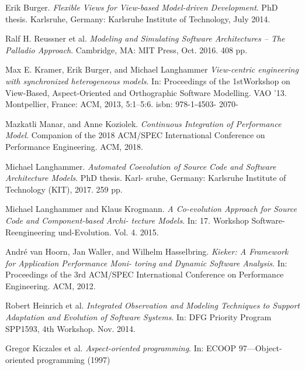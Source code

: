 \documentclass[twoside, english]{sdqthesis}
\begin{document}
\begin{thebibliography}{9}


Erik Burger. 
\textit{Flexible Views for View-based Model-driven Development}. 
PhD thesis. Karlsruhe, Germany: Karlsruhe Institute of Technology, July 2014.

Ralf H. Reussner et al. 
\textit{Modeling and Simulating Software Architectures – The Palladio Approach}. 
Cambridge, MA: MIT Press, Oct. 2016. 408 pp.

Max E. Kramer, Erik Burger, and Michael Langhammer 
\textit{View-centric engineering
with synchronized heterogeneous models}. 
In: Proceedings of the
1stWorkshop on View-Based, Aspect-Oriented and Orthographic Software Modelling.
VAO ’13. Montpellier, France: ACM, 2013, 5:1–5:6. isbn: 978-1-4503-
2070-

Mazkatli Manar, and Anne Koziolek. 
\textit{Continuous Integration of Performance Model}. 
Companion of the 2018 ACM/SPEC International Conference on Performance Engineering. ACM, 2018.

Michael Langhammer.  
\textit{Automated Coevolution of Source Code and Software Architecture Models}. 
PhD thesis. Karl- sruhe, Germany: Karlsruhe Institute of Technology (KIT), 2017. 259 pp.

Michael Langhammer and Klaus Krogmann.  
\textit{A Co-evolution Approach for Source Code and Component-based Archi- tecture Models}. 
 In: 17. Workshop Software-Reengineering und-Evolution. Vol. 4. 2015.

André van Hoorn, Jan Waller, and Wilhelm Hasselbring.  
\textit{Kieker: A Framework for Application Performance Moni- toring and Dynamic Software Analysis}. 
In: Proceedings of the 3rd ACM/SPEC International Conference on Performance Engineering. ACM, 2012.


Robert Heinrich et al.  
\textit{Integrated Observation and Modeling Techniques to Support Adaptation and Evolution of Software Systems}. 
In: DFG Priority Program SPP1593, 4th Workshop. Nov. 2014.


 
Gregor Kiczales et al.
\textit{Aspect-oriented programming}. 
 In: ECOOP 97—Object-oriented programming (1997)
 



\end{thebibliography}
\end{document}
